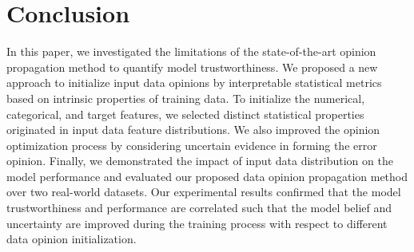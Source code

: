 \section{Conclusion}
\label{conc}
In this paper, we investigated the limitations of the state-of-the-art opinion propagation method to quantify model trustworthiness. We proposed a new approach to initialize input data opinions by interpretable statistical metrics based on intrinsic properties of training data. To initialize the numerical, categorical, and target features, we selected distinct statistical properties originated in input data feature distributions. We also improved the opinion optimization process by considering uncertain evidence in forming the error opinion. Finally, we demonstrated the impact of input data distribution on the model performance and evaluated our proposed data opinion propagation method over two real-world datasets. Our experimental results confirmed that the model trustworthiness and performance are correlated such that the model belief and uncertainty are improved during the training process with respect to different data opinion initialization.   















